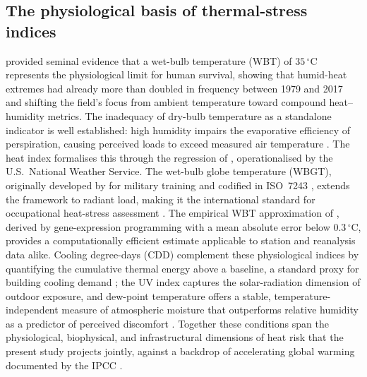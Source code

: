 \documentclass[review,11pt]{elsarticle}
\newcommand{\degC}{\ensuremath{^{\circ}\mathrm{C}}}
\begin{document}
\subsection{The physiological basis of thermal-stress indices}
\citet{raymond2020} provided seminal evidence that a wet-bulb temperature (WBT)
of $35\,\degC$ represents the physiological limit for human survival, showing that
humid-heat extremes had already more than doubled in frequency between 1979 and
2017 and shifting the field's focus from ambient temperature toward compound
heat--humidity metrics. The inadequacy of dry-bulb temperature as a standalone
indicator is well established: high humidity impairs the evaporative efficiency of
perspiration, causing perceived loads to exceed measured air temperature
\citep{steadman1979}. The heat index formalises this through the regression of
\citet{rothfusz1990}, operationalised by the U.S.\ National Weather Service. The
wet-bulb globe temperature (WBGT), originally developed by \citet{yaglou1957} for
military training and codified in ISO~7243 \citep{iso7243_2017}, extends the
framework to radiant load, making it the international standard for occupational
heat-stress assessment \citep{parsons2006}. The empirical WBT approximation of
\citet{stull2011}, derived by gene-expression programming with a mean absolute
error below $0.3\,\degC$, provides a computationally efficient estimate applicable
to station and reanalysis data alike. Cooling degree-days (CDD) complement these
physiological indices by quantifying the cumulative thermal energy above a
baseline, a standard proxy for building cooling demand \citep{spinoni2018,
bhatnagar2018}; the UV index \citep{who2002} captures the solar-radiation
dimension of outdoor exposure, and dew-point temperature offers a stable,
temperature-independent measure of atmospheric moisture that outperforms relative
humidity as a predictor of perceived discomfort \citep{lawrence2005}. Together
these conditions span the physiological, biophysical, and infrastructural
dimensions of heat risk that the present study projects jointly, against a
backdrop of accelerating global warming documented by the IPCC \citep{ipcc2022ar6}.
\end{document}
